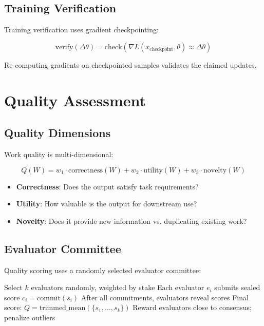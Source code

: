 \documentclass[11pt,letterpaper]{article}
\begin{document}
\subsection{Training Verification}

Training verification uses gradient checkpointing:

\begin{equation}
\text{verify}(\Delta\theta) = \text{check}(\nabla L(x_{\text{checkpoint}}, \theta) \approx \Delta\theta)
\end{equation}

Re-computing gradients on checkpointed samples validates the claimed updates.

\section{Quality Assessment}
\label{sec:quality}

\subsection{Quality Dimensions}

Work quality is multi-dimensional:

\begin{equation}
Q(W) = w_1 \cdot \text{correctness}(W) + w_2 \cdot \text{utility}(W) + w_3 \cdot \text{novelty}(W)
\end{equation}

\begin{itemize}
    \item \textbf{Correctness}: Does the output satisfy task requirements?
    \item \textbf{Utility}: How valuable is the output for downstream use?
    \item \textbf{Novelty}: Does it provide new information vs. duplicating existing work?
\end{itemize}

\subsection{Evaluator Committee}

Quality scoring uses a randomly selected evaluator committee:

\begin{algorithm}
\caption{Quality Scoring Protocol}
\label{alg:quality}
\begin{algorithmic}[1]
\STATE Select $k$ evaluators randomly, weighted by stake
\STATE Each evaluator $e_i$ submits sealed score $c_i = \text{commit}(s_i)$
\STATE After all commitments, evaluators reveal scores
\STATE Final score: $Q = \text{trimmed\_mean}(\{s_1, \ldots, s_k\})$
\STATE Reward evaluators close to consensus; penalize outliers
\end{algorithmic}
\end{algorithm}
\end{document}
